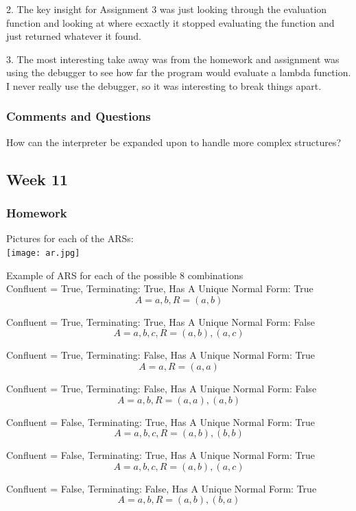 \documentclass{article}
\theoremstyle{theorem}
\theoremstyle{definition}
\theoremstyle{remark}
\begin{document}
2. The key insight for Assignment 3 was just looking through the evaluation function and looking at where ecxactly it stopped evaluating the function and just returned whatever it found.

3. The most interesting take away was from the homework and assignment was using the debugger to see how far the program would evaluate a lambda function. I never really use the debugger, so it was interesting to break things apart.
\subsubsection*{Comments and Questions}
How can the interpreter be expanded upon to handle more complex structures?

\subsection{Week 11}
\subsubsection*{Homework}
Pictures for each of the ARSs: \\
\texttt{[image: ar.jpg]}

Example of ARS for each of the possible 8 combinations\\

Confluent = True, Terminating: True, Has A Unique Normal Form: True\\
\[A={a,b}, R={(a,b)}\]

Confluent = True, Terminating: True, Has A Unique Normal Form: False\\
\[A={a,b,c}, R={(a,b),(a,c)}\]

Confluent = True, Terminating: False, Has A Unique Normal Form: True\\
\[A={a}, R={(a,a)}\]

Confluent = True, Terminating: False, Has A Unique Normal Form: False\\
\[A={a,b}, R={(a,a),(a,b)}\]

Confluent = False, Terminating: True, Has A Unique Normal Form: True\\
\[A={a,b,c}, R={(a,b),(b,b)}\]

Confluent = False, Terminating: True, Has A Unique Normal Form: True\\
\[A={a,b,c}, R={(a,b),(a,c)}\]

Confluent = False, Terminating: False, Has A Unique Normal Form: True\\
\[A={a,b}, R={(a,b),(b,a)}\]
\end{document}
